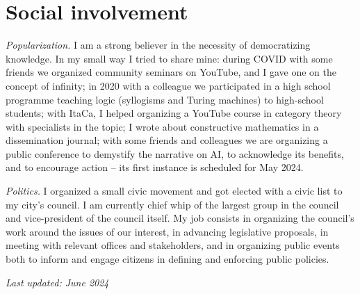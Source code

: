 \documentclass[a4paper,9pt]{article}
\begin{document}
\section*{ Social involvement}
\textit{Popularization.} I am a strong believer in the necessity of democratizing knowledge. In my small way I tried
to share mine: during COVID with some friends we organized community seminars on YouTube, and I gave one on the concept of infinity; in 2020 with a colleague we participated in a high school programme teaching logic (syllogisms and Turing machines) to high-school students; with ItaCa, I helped organizing a YouTube course in category theory with specialists in the topic; I wrote about constructive mathematics in a dissemination journal; with some friends and colleagues we are organizing a public conference to demystify the narrative on AI, to acknowledge its benefits, and to encourage action -- its first instance is scheduled for May 2024.

\textit{Politics.} I organized a small civic movement and got elected with a civic list to my city's council. I am
currently chief whip of the largest group in the council and vice-president of the council itself.
My job consists in organizing the council's work around the issues of our interest, in advancing legislative
proposals, in meeting with relevant offices and stakeholders, and in organizing public events both to inform
and engage citizens in defining and enforcing public policies.

\vfill
\hfill\small\textit{Last updated: June 2024}
\end{document}
